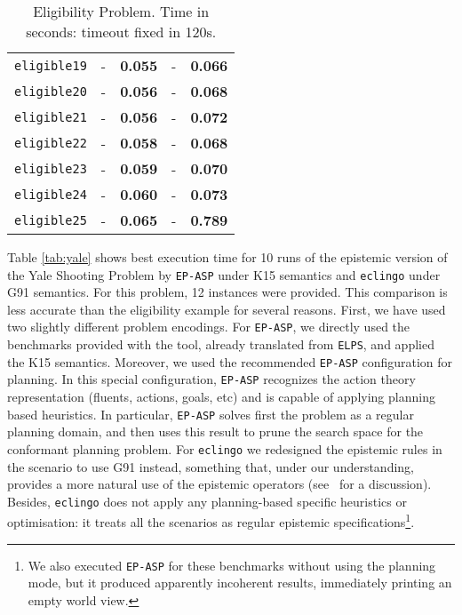 \documentclass{new_tlp}
\def\eclingo{{\tt eclingo}}
\def\EPASP{{\tt EP-ASP}}
\begin{document}
\begin{table}[ht]
\begin{tabular}{c|rr|rr}
    \texttt{eligible19} & -          & {\bf 0.055}       & -          & {\bf 0.066}       \\
    \texttt{eligible20} & -          & {\bf 0.056}       & -          & {\bf 0.068}       \\
    \texttt{eligible21} & -          & {\bf 0.056}       & -          & {\bf 0.072}       \\
    \texttt{eligible22} & -          & {\bf 0.058}       & -          & {\bf 0.068}       \\
    \texttt{eligible23} & -          & {\bf 0.059}       & -          & {\bf 0.070}       \\
    \texttt{eligible24} & -          & {\bf 0.060}       & -          & {\bf 0.073}       \\
    \texttt{eligible25} & -          & {\bf 0.065}       & -          & {\bf 0.789}       \\ \hline
    \end{tabular}
\caption{Eligibility Problem. Time in seconds: timeout fixed in 120s.}
\label{tab:eligible}
\end{table}

Table \ref{tab:yale} shows best execution time for 10 runs of the epistemic version of the Yale Shooting Problem by \EPASP{} under K15 semantics and \eclingo{} under G91 semantics. For this problem, 12 instances were provided. This comparison is less accurate than the eligibility example for several reasons. First, we have used two slightly different problem encodings. For \EPASP{}, we directly used the benchmarks provided with the tool, already translated from {\tt ELPS}, and applied the K15 semantics. Moreover, we used the recommended \EPASP{} configuration for planning. In this special configuration, \EPASP{} recognizes the action theory representation (fluents, actions, goals, etc) and is capable of applying planning based heuristics. In particular, \EPASP{} solves first the problem as a regular planning domain, and then uses this result to prune the search space for the conformant planning problem. For \eclingo{} we redesigned the epistemic rules in the scenario to use G91 instead, something that, under our understanding, provides a more natural use of the epistemic operators (see~\cite{cafafa19a} for a discussion). Besides, \eclingo{} does not apply any planning-based specific heuristics or optimisation: it treats all the scenarios as regular epistemic specifications\footnote{We also executed \EPASP{} for these benchmarks without using the planning mode, but it produced apparently incoherent results, immediately printing an empty world view.}.
\end{document}
